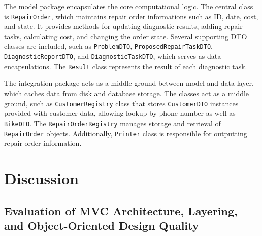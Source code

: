 \documentclass[a4paper]{scrartcl}
\begin{document}
The model package encapsulates the core computational logic. The central class is \texttt{RepairOrder}, which maintains repair order informations such as ID, date, cost, and state. It provides methods for updating diagnostic results, adding repair tasks, calculating cost, and changing the order state. Several supporting DTO classes are included, such as \texttt{ProblemDTO}, \texttt{ProposedRepairTaskDTO}, \texttt{DiagnosticReportDTO}, and \texttt{DiagnosticTaskDTO}, which serves as data encapsulations. The \texttt{Result} class represents the result of each diagnostic task.

The integration package acts as a middle-ground between model and data layer, which caches data from disk and database storage. The classes act as a middle ground, such as \texttt{CustomerRegistry} class that stores \texttt{CustomerDTO} instances provided with customer data, allowing lookup by phone number as well as \texttt{BikeDTO}. The \texttt{RepairOrderRegistry} manages storage and retrieval of \texttt{RepairOrder} objects. Additionally, \texttt{Printer} class is responsible for outputting repair order information.

\section{Discussion}


\subsection{Evaluation of MVC Architecture, Layering, and Object-Oriented Design Quality}

\end{document}
